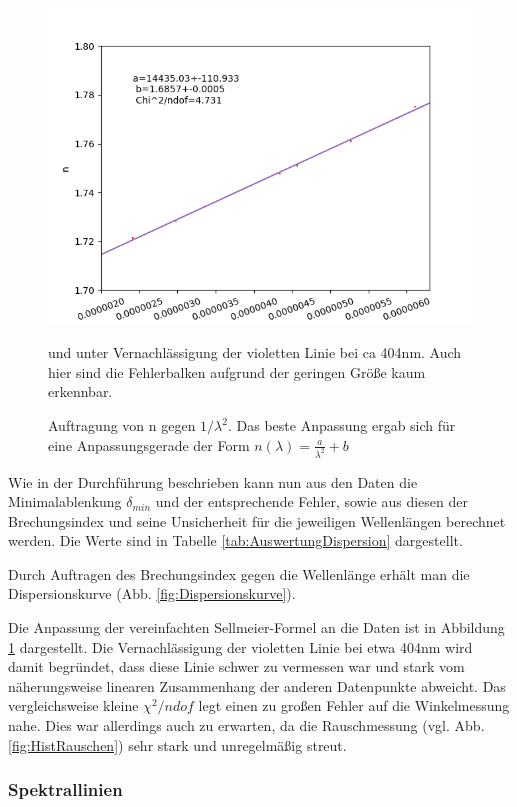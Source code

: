 \documentclass[12pt,a4paper]{article}
\begin{document}
	\begin{figure}
		\includegraphics[scale=1.0]{Bilder/Regression.png}
		\caption{Auftragung von n gegen $1/\lambda^2$. Das beste Anpassung ergab sich für eine Anpassungsgerade der Form $n(\lambda) = \frac{a}{\lambda^2} + b $} und unter Vernachlässigung der violetten Linie bei ca 404nm. Auch hier sind die Fehlerbalken aufgrund der geringen Größe kaum erkennbar.
		\label{fig:RegressionDispersion}
	\end{figure}
	
	
	Wie in der Durchführung beschrieben kann nun aus den Daten die Minimalablenkung $\delta_{min}$ und der entsprechende Fehler, sowie aus diesen der Brechungsindex und seine Unsicherheit für die jeweiligen Wellenlängen berechnet werden.
	Die Werte sind in Tabelle \ref{tab:AuswertungDispersion} dargestellt.
	
	Durch Auftragen des Brechungsindex gegen die Wellenlänge erhält man die Dispersionskurve (Abb. \ref{fig:Dispersionskurve}).
	
	Die Anpassung der vereinfachten Sellmeier-Formel an die Daten ist in Abbildung \ref{fig:RegressionDispersion} dargestellt. Die Vernachlässigung der violetten Linie bei etwa 404nm wird damit begründet, dass diese Linie schwer zu vermessen war und stark vom näherungsweise linearen Zusammenhang der anderen Datenpunkte abweicht.
	Das vergleichsweise kleine $\chi^2 / ndof$ legt einen zu großen Fehler auf die Winkelmessung nahe. Dies war allerdings auch zu erwarten, da die Rauschmessung (vgl. Abb. \ref{fig:HistRauschen}) sehr stark und unregelmäßig streut.
	\subsubsection{Spektrallinien}
\end{document}
